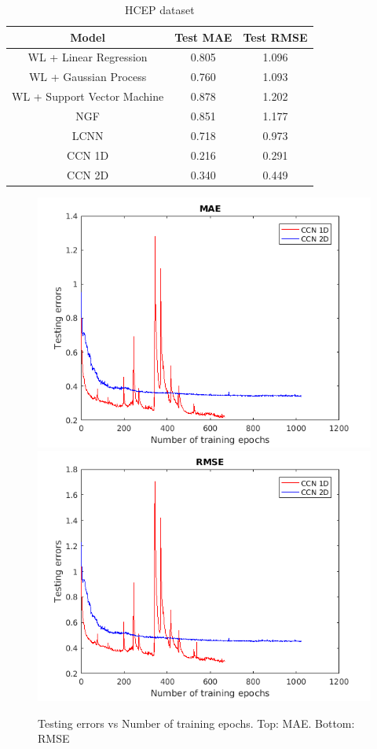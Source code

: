 \documentclass[a4paper]{article}
\begin{document}
\begin{table}[h]
\caption{HCEP dataset}\label{tab:HCEP}
\begin{tabular}{|| c | c | c ||} 
\hline
Model & Test MAE & Test RMSE \\
\hline
\hline
WL + Linear Regression & 0.805 & 1.096 \\
\hline
WL + Gaussian Process & 0.760 & 1.093 \\ 
\hline
WL + Support Vector Machine & 0.878 & 1.202 \\
\hline
NGF & 0.851 & 1.177 \\
\hline
LCNN & 0.718 & 0.973 \\
\hline 
CCN 1D & {\color{red} 0.216} & {\color{red} 0.291} \\
\hline
CCN 2D & {\color{red} 0.340} & {\color{red} 0.449} \\
\hline
\end{tabular}
\end{table}

\begin{figure}[h]
\caption{Testing errors vs Number of training epochs. Top: MAE. Bottom: RMSE}\label{fig:error_vs_epoch}
\includegraphics[width=\columnwidth]{MAE}
\includegraphics[width=\columnwidth]{RMSE}
\end{figure}
\end{document}

